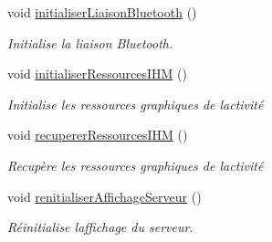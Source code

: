 \begin{DoxyCompactItemize}
void \hyperlink{classcom_1_1example_1_1area_1_1_i_h_m_gestion_partie_a98f583c39004081b004b854085000256}{initialiser\+Liaison\+Bluetooth} ()
\begin{DoxyCompactList}\small\item\em Initialise la liaison Bluetooth. \end{DoxyCompactList}\item 
void \hyperlink{classcom_1_1example_1_1area_1_1_i_h_m_gestion_partie_a7d67797752c3b0f4e0cab951c8e11e8d}{initialiser\+Ressources\+I\+HM} ()
\begin{DoxyCompactList}\small\item\em Initialise les ressources graphiques de l\textquotesingle{}activité \end{DoxyCompactList}\item 
void \hyperlink{classcom_1_1example_1_1area_1_1_i_h_m_gestion_partie_a2161909470bc787c850df7266c44a0c2}{recuperer\+Ressources\+I\+HM} ()
\begin{DoxyCompactList}\small\item\em Recupère les ressources graphiques de l\textquotesingle{}activité \end{DoxyCompactList}\item 
void \hyperlink{classcom_1_1example_1_1area_1_1_i_h_m_gestion_partie_a4f5930a69896d1d75add34badfb168eb}{renitialiser\+Affichage\+Serveur} ()
\begin{DoxyCompactList}\small\item\em Réinitialise l\textquotesingle{}affichage du serveur. \end{DoxyCompactList}\end{DoxyCompactItemize}
